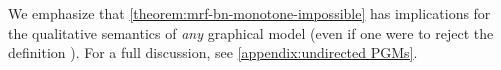 We emphasize that \cref{theorem:mrf-bn-monotone-impossible} has implications for the qualitative semantics of \emph{any} graphical model (even if one were to reject the definition \scibility). 
For a full discussion, see \cref{appendix:undirected PGMs}.
%

